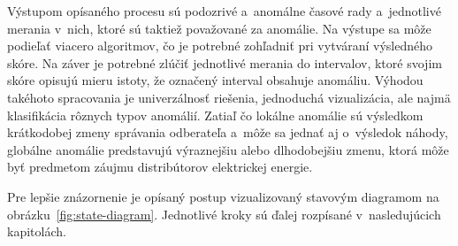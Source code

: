 \documentclass[a4paper,twoside,slovak,12pt,appendix]{article}
\begin{document}

Výstupom opísaného procesu sú podozrivé a~anomálne časové rady a~jednotlivé
merania v~nich, ktoré sú taktiež považované za anomálie. Na výstupe sa môže
podieľať viacero algoritmov, čo je potrebné zohľadniť pri vytváraní výsledného
skóre. Na záver je potrebné zlúčiť jednotlivé merania do intervalov, ktoré
svojim skóre opisujú mieru istoty, že označený interval obsahuje anomáliu.
Výhodou takéhoto spracovania je univerzálnosť riešenia, jednoduchá vizualizácia,
ale najmä klasifikácia rôznych typov anomálií. Zatiaľ čo lokálne anomálie sú
výsledkom krátkodobej zmeny správania odberateľa a~môže sa jednať aj o~výsledok
náhody, globálne anomálie predstavujú výraznejšiu alebo dlhodobejšiu zmenu,
ktorá môže byť predmetom záujmu distribútorov elektrickej energie.

Pre lepšie znázornenie je opísaný postup vizualizovaný stavovým diagramom na
obrázku~\ref{fig:state-diagram}. Jednotlivé kroky sú ďalej rozpísané
v~nasledujúcich kapitolách.
\end{document}
